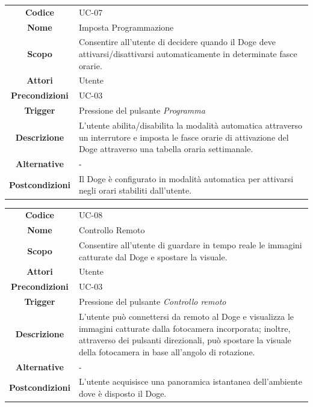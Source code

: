 \documentclass{article}
\begin{document}
    \begin{adjustbox}{center}
    \begin{tabular}{|c|p{10cm}|}
    \hline
    \textbf{Codice} & UC-07 \\
    \textbf{Nome} & Imposta Programmazione \\
    \textbf{Scopo} & Consentire all'utente di decidere quando il Doge deve attivarsi/disattivarsi automaticamente in determinate fasce
    orarie. \\
    \textbf{Attori} & Utente \\
    \textbf{Precondizioni} & UC-03 \\
    \textbf{Trigger} & Pressione del pulsante \emph{Programma} \\
    \textbf{Descrizione} & L'utente abilita/disabilita la modalità automatica attraverso un interrutore e imposta le fasce orarie di attivazione del Doge
    attraverso una tabella oraria settimanale. \\
    \textbf{Alternative} & - \\
    \textbf{Postcondizioni} & Il Doge è configurato in modalità automatica per attivarsi negli orari stabiliti dall'utente. \\
    \hline
    \end{tabular}
    \end{adjustbox}
    
    \begin{adjustbox}{center}
    \begin{tabular}{|c|p{10cm}|}
    \hline
    \textbf{Codice} & UC-08 \\
    \textbf{Nome} & Controllo Remoto \\
    \textbf{Scopo} & Consentire all'utente di guardare in tempo reale le immagini catturate dal Doge e spostare la visuale. \\
    \textbf{Attori} & Utente \\
    \textbf{Precondizioni} & UC-03 \\
    \textbf{Trigger} & Pressione del pulsante \emph{Controllo remoto} \\
    \textbf{Descrizione} & L'utente può connettersi da remoto al Doge e visualizza le immagini catturate dalla fotocamera incorporata; inoltre, attraverso dei pulsanti
    direzionali, può spostare la visuale della fotocamera in base all'angolo
    di rotazione. \\
    \textbf{Alternative} & - \\
    \textbf{Postcondizioni} & L'utente acquisisce una panoramica istantanea dell'ambiente dove è disposto il Doge. \\
    \hline
    \end{tabular}
    \end{adjustbox}
    
\end{document}
